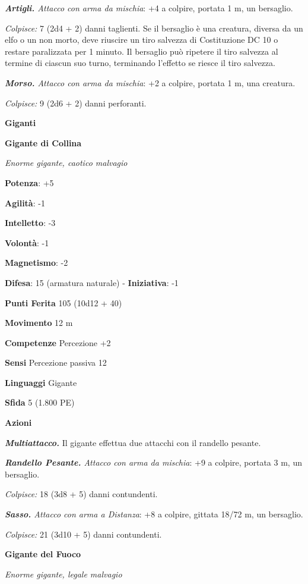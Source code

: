\begin{multicols}{2}
\emph{\textbf{Artigli.} Attacco con arma da mischia}: +4 a colpire,
portata 1 m, un bersaglio.

\emph{Colpisce:} 7 (2d4 + 2) danni taglienti. Se il bersaglio è una
creatura, diversa da un elfo o un non morto, deve riuscire un tiro
salvezza di Costituzione DC 10 o restare paralizzata per 1 minuto. Il
bersaglio può ripetere il tiro salvezza al termine di ciascun suo turno,
terminando l'effetto se riesce il tiro salvezza.

\emph{\textbf{Morso.} Attacco con arma da mischia}: +2 a colpire,
portata 1 m, una creatura.

\emph{Colpisce:} 9 (2d6 + 2) danni perforanti.



\textbf{Giganti}

\textbf{Gigante di Collina}

\emph{Enorme gigante, caotico malvagio}

\textbf{Potenza}: +5

\textbf{Agilità}: -1

\textbf{Intelletto}: -3

\textbf{Volontà}: -1

\textbf{Magnetismo}: -2

\textbf{Difesa}: 15 (armatura naturale) - \textbf{Iniziativa}: -1

\textbf{Punti Ferita} 105 (10d12 + 40)

\textbf{Movimento} 12 m

\textbf{Competenze} Percezione +2

\textbf{Sensi} Percezione passiva 12

\textbf{Linguaggi} Gigante

\textbf{Sfida} 5 (1.800 PE)\smallskip

\smallskip\textbf{Azioni}

\emph{\textbf{Multiattacco.}} Il gigante effettua due attacchi con il
randello pesante.

\emph{\textbf{Randello Pesante.} Attacco con arma da mischia}: +9 a
colpire, portata 3 m, un bersaglio.

\emph{Colpisce:} 18 (3d8 + 5) danni contundenti.

\emph{\textbf{Sasso.} Attacco con arma a Distanza}: +8 a colpire,
gittata 18/72 m, un bersaglio.

\emph{Colpisce:} 21 (3d10 + 5) danni contundenti.

\textbf{Gigante del Fuoco}

\emph{Enorme gigante, legale malvagio}


\end{multicols}
